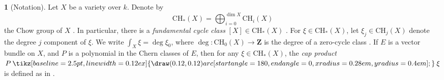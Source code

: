 \documentclass[english]{smfart}
\renewcommand{\mathbb}{\mathbf}
\newcommand{\capprod}{\mathbin{
  \tikz[baseline=\the\dimexpr\fontdimen22\textfont2\relax, line width=0.12ex] {
    \draw (0.12,0.12) arc[start angle=180, end angle=0, x radius=0.28em, y radius=0.4em];
  }
}}
\theoremstyle{remark}
\theoremstyle{plain}
\theoremstyle{definition}
\numberwithin{equation}{remark}
\theoremstyle{void}
\newtheorem{situation}[remark]{}
\begin{document}
\begin{situation}[Notation]
Let \(X\) be a variety over \(k\).  Denote by
\[
\mathrm{CH}_{\ast}(X) = \bigoplus_{i=0}^{\dim X} \mathrm{CH}_i(X)
\]
the Chow group of \(X\) \cite[\S1.3]{fulton_intersection-theory}.
In particular, there is a
\emph{fundamental cycle class} \([X] \in \mathrm{CH}_{\ast}(X)\)
\cite[\S1.5]{fulton_intersection-theory}.  For
\(\xi \in \mathrm{CH}_{\ast}(X)\), let \(\xi_j \in \mathrm{CH}_j(X)\)
denote the degree \(j\) component of \(\xi\).
We write \(\int_X \xi = \deg \xi_0\), where \(\deg\colon \mathrm{CH}_0(X) \to \mathbb{Z}\)
is the degree of a zero-cycle class \cite[Definition~1.4]{fulton_intersection-theory}.
If \(E\) is a vector bundle on \(X\), and \(P\) is a polynomial in the Chern
classes of \(E\), then for any \(\xi \in \mathrm{CH}_{\ast}(X)\), the
\emph{cap product} \(P \capprod \xi\) is defined as in
\cite[\S3.2]{fulton_intersection-theory}.
\end{situation}
\end{document}
